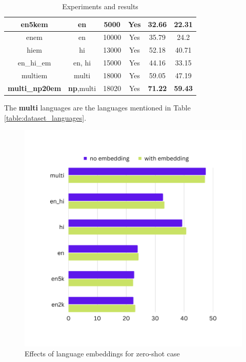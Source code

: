 \begin{table}[ht]
\begin{center}
{\begin{tabular}{|c|c|c|c|c|c|}
            en5kem & en & 5000 & Yes & 32.66 & 22.31 \\
            \hline
            enem & en & 10000 & Yes & 35.79 & 24.2 \\
            \hline
            hiem & hi & 13000 & Yes & 52.18 & 40.71 \\
            \hline
            en\_hi\_em & en, hi & 15000 & Yes & 44.16 & 33.15 \\
            \hline
            multiem & multi & 18000 & Yes & 59.05 & 47.19 \\
            \hline
            \textbf{multi\_np20em} & \textbf{np},multi & 18020 & Yes & \textbf{71.22} & \textbf{59.43} \\
            \hline
        \end{tabular}
        }
        \caption{Experiments and results}
        \label{table:experiments_results}
    \end{center}
\end{table}
The \textbf{multi} languages are the languages mentioned in Table \ref{table:dataset_languages}.

\begin{figure}[!h]
    \center
    \includegraphics[scale=0.3]{images/results}
    \caption{Effects of language embeddings for zero-shot case}
    \label{results}
\end{figure}

